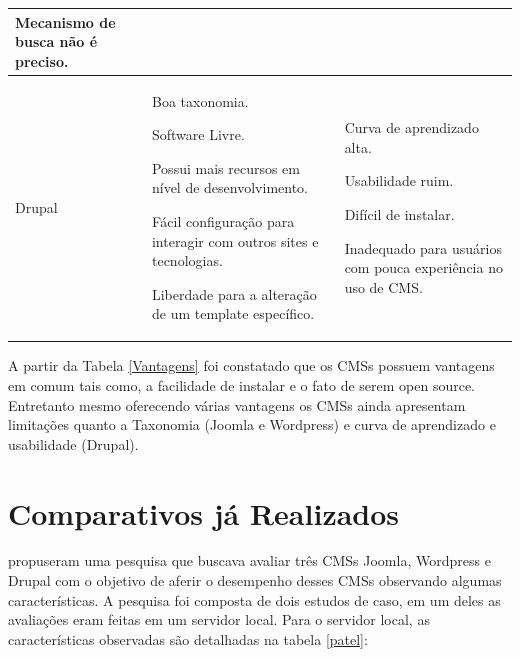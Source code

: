 \begin{center}
\begin{longtable}{|p{65pt}|p{140pt}|p{140pt}|}
{ 	               Mecanismo de busca não é preciso.
 	             
 	
 	}\\
 	\hline
 	 {\raggedright Drupal} 
 	 & {\raggedright %
			  Boa taxonomia.
			  
			  Software Livre.
			  
			  Possui mais recursos em nível de desenvolvimento.
			  
			  Fácil configuração para interagir com outros sites e tecnologias.
			  
			  Liberdade para a alteração de um template específico.
			  
			  
			  
 	 
 	 }
& {\raggedright Curva de aprendizado alta.

		 Usabilidade ruim.	
		 
		 Difícil de instalar.
		 
		 Inadequado para usuários com pouca experiência no uso de CMS.

  }\\
 	\hline
 	\end{longtable}
 	
 	\end{center}
 	
A partir da Tabela \ref{Vantagens} foi constatado que os CMSs possuem vantagens em comum tais como, a facilidade de instalar e o fato de serem open source. Entretanto mesmo oferecendo várias vantagens os CMSs ainda apresentam limitações quanto a Taxonomia (Joomla e Wordpress) e curva de aprendizado e usabilidade (Drupal).


\section{Comparativos já Realizados}

 propuseram uma pesquisa que buscava avaliar três CMSs Joomla, Wordpress e Drupal com o objetivo de aferir o desempenho desses CMSs observando algumas características. A pesquisa foi composta de dois estudos de caso, em um deles as avaliações eram feitas em um servidor local. Para o servidor local, as características observadas são detalhadas na tabela \ref{patel}:


